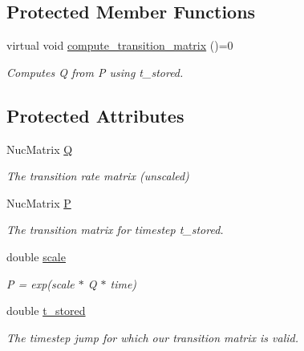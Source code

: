\subsection*{Protected Member Functions}
\begin{DoxyCompactItemize}
\item 
virtual void \mbox{\hyperlink{classrcombinator_1_1PointMutationModel_a2c09d4382b77a3b0e3d9d097a679075d}{compute\+\_\+transition\+\_\+matrix}} ()=0
\begin{DoxyCompactList}\small\item\em Computes Q from P using t\+\_\+stored. \end{DoxyCompactList}\end{DoxyCompactItemize}
\subsection*{Protected Attributes}
\begin{DoxyCompactItemize}
\item 
\mbox{\label{classrcombinator_1_1PointMutationModel_a0260e78df73c82b912984b7c916f21a9}} 
Nuc\+Matrix \mbox{\hyperlink{classrcombinator_1_1PointMutationModel_a0260e78df73c82b912984b7c916f21a9}{Q}}
\begin{DoxyCompactList}\small\item\em The transition rate matrix (unscaled) \end{DoxyCompactList}\item 
\mbox{\label{classrcombinator_1_1PointMutationModel_a6f2f6977702777b9f8b14f986db06c78}} 
Nuc\+Matrix \mbox{\hyperlink{classrcombinator_1_1PointMutationModel_a6f2f6977702777b9f8b14f986db06c78}{P}}
\begin{DoxyCompactList}\small\item\em The transition matrix for timestep {\itshape t\+\_\+stored}. \end{DoxyCompactList}\item 
\mbox{\label{classrcombinator_1_1PointMutationModel_a328a30a438bb1b6a625faa3f714a85c8}} 
double \mbox{\hyperlink{classrcombinator_1_1PointMutationModel_a328a30a438bb1b6a625faa3f714a85c8}{scale}}
\begin{DoxyCompactList}\small\item\em P = exp(scale $\ast$ Q $\ast$ time) \end{DoxyCompactList}\item 
\mbox{\label{classrcombinator_1_1PointMutationModel_a8ae23bc482a483e139cdb94bdc332a72}} 
double \mbox{\hyperlink{classrcombinator_1_1PointMutationModel_a8ae23bc482a483e139cdb94bdc332a72}{t\+\_\+stored}}
\begin{DoxyCompactList}\small\item\em The timestep jump for which our transition matrix is valid. \end{DoxyCompactList}\end{DoxyCompactItemize}


